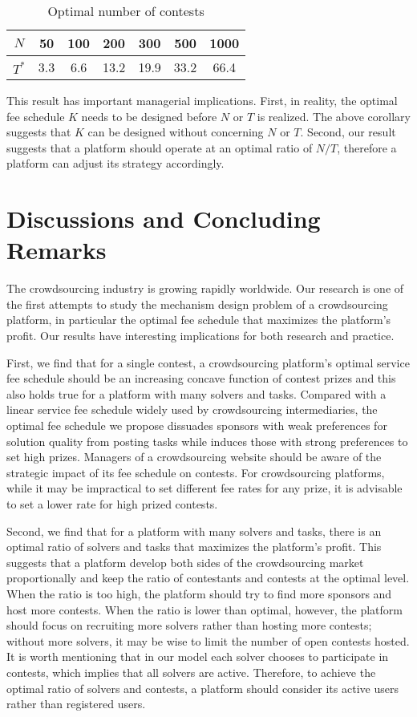 \documentclass[12pt]{article}
\begin{document}
\begin{table}
\centering
\begin{tabular}{|c|c|c|c|c|c|c|}
\hline
$N$ & 50 & 100 & 200 & 300 & 500 & 1000\tabularnewline
\hline
\hline
$T^*$ & 3.3 & 6.6 & 13.2 & 19.9 & 33.2 & 66.4\tabularnewline
\hline
\end{tabular}\caption{Optimal number of contests}
\end{table}

This result has important managerial implications. First, in reality, the optimal fee schedule $K$ needs to be designed before $N$ or $T$ is realized. The above corollary suggests that $K$ can be designed without concerning $N$ or $T$. Second, our result suggests that a platform should operate at an optimal ratio of $N/T$, therefore a platform can adjust its strategy accordingly.

\section{Discussions and Concluding Remarks}

The crowdsourcing industry is growing rapidly worldwide. Our research is one of the first attempts to study the mechanism design problem of a crowdsourcing platform, in particular the optimal fee schedule that maximizes the platform's profit. Our results have interesting implications for both research and practice.

First, we find that for a single contest, a crowdsourcing platform's optimal service fee schedule should be an increasing concave function of contest prizes and this also holds true for a platform with many solvers and tasks. Compared with a linear service fee schedule widely used by crowdsourcing intermediaries, the optimal fee schedule we propose dissuades sponsors with weak preferences for solution quality from posting tasks while induces those with strong preferences to set high prizes. Managers of a crowdsourcing website should be aware of the strategic impact of its fee schedule on contests. For crowdsourcing platforms, while it may be impractical to set different fee rates for any prize, it is advisable to set a lower rate for high prized contests.

Second, we find that for a platform with many solvers and tasks, there is an optimal ratio of solvers and tasks that maximizes the platform's profit. This suggests that a platform develop both sides of the crowdsourcing market proportionally and keep the ratio of contestants and contests at the optimal level. When the ratio is too high, the platform should try to find more sponsors and host more contests. When the ratio is lower than optimal, however, the platform should focus on recruiting more solvers rather than hosting more contests; without more solvers, it may be wise to limit the number of open contests hosted. It is worth mentioning that in our model each solver chooses to participate in contests, which implies that all solvers are active. Therefore, to achieve the optimal ratio of solvers and contests, a platform should consider its active users rather than registered users.
\end{document}
